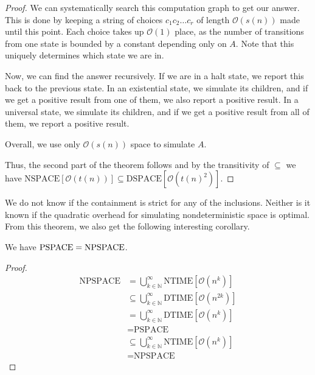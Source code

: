 \begin{proof}
    We can systematically search this computation graph to get our answer.
    This is done by keeping a string of choices $c_{1}c_{2}\dots c_r$ of length $\mathcal{O}(s(n))$ made until this point.
    Each choice takes up $\mathcal{O}(1)$ place, as the number of transitions from one state is bounded by a constant depending only on $A$.
    Note that this uniquely determines which state we are in.

    Now, we can find the answer recursively.
    If we are in a halt state, we report this back to the previous state.
    In an existential state, we simulate its children, and if we get a positive result from one of them, we also report a positive result.
    In a universal state, we simulate its children, and if we get a positive result from all of them, we report a positive result.

    Overall, we use only $\mathcal{O}(s(n))$ space to simulate $A$.

    Thus, the second part of the theorem follows and by the transitivity of $\subseteq$ we have $\text{NSPACE}[\mathcal{O}(t(n))] \subseteq \text{DSPACE}[\mathcal{O}(t(n)^2)]$.
\end{proof}

We do not know if the containment is strict for any of the inclusions.
Neither is it known if the quadratic overhead for simulating nondeterministic space is optimal.
From this theorem, we also get the following interesting corollary.

\begin{corollary}
    We have $\text{\upshape PSPACE} = \text{\upshape NPSPACE}$.
\end{corollary}

\begin{proof}
    \begin{align*}
        \text{NPSPACE} &= \bigcup_{k \in \mathbb{N}}^{\infty}\text{NTIME}[\mathcal{O}(n^k)] \\
        &\subseteq \bigcup_{k\in \mathbb{N}}^{\infty}\text{DTIME}[\mathcal{O}(n^{2k})] \\
        &= \bigcup_{k\in \mathbb{N}}^{\infty}\text{DTIME}[\mathcal{O}(n^{k})] \\
        &= \text{PSPACE} \\
        &\subseteq \bigcup_{k\in \mathbb{N}}^{\infty}\text{NTIME}[\mathcal{O}(n^{k})] \\
        &= \text{NPSPACE}
    \end{align*}
\end{proof}


